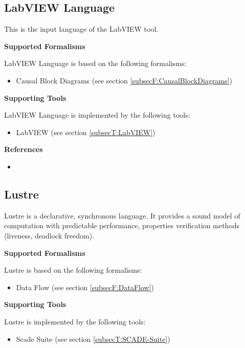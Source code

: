 \subsection{LabVIEW Language}
\label{subsecL:LabVIEWLanguage}


This is the input language of the LabVIEW tool.

\textbf{Supported Formalisms}

LabVIEW Language is based on the following formalisms:
\begin{itemize}
	\item Causal Block Diagrams (see section \ref{subsecF:CausalBlockDiagrams})
\end{itemize}


\textbf{Supporting Tools}

LabVIEW Language is implemented by the following tools:
\begin{itemize}
	\item LabVIEW (see section \ref{subsecT:LabVIEW})
\end{itemize}


\textbf{References}
\begin{itemize}
	
\item {}
\end{itemize}



\subsection{Lustre}
\label{subsecL:Lustre}


Lustre is a declarative, synchronous language. It provides a sound model of computation with predictable performance, properties verification methods (liveness, deadlock freedom).

\textbf{Supported Formalisms}

Lustre is based on the following formalisms:
\begin{itemize}
	\item Data Flow (see section \ref{subsecF:DataFlow})
\end{itemize}


\textbf{Supporting Tools}

Lustre is implemented by the following tools:
\begin{itemize}
	\item Scade Suite (see section \ref{subsecT:SCADE-Suite})
\end{itemize}


